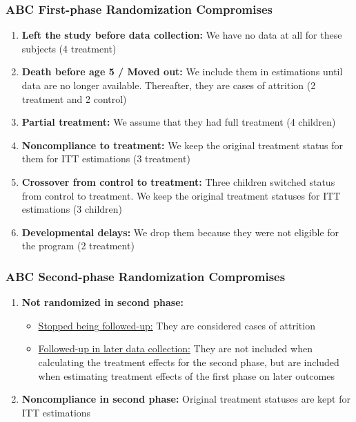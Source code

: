 \documentclass[static]{JJH-Beamer}
\begin{document}
\begin{frame}
 \addtocounter{framenumber}{-1}
\frametitle{ABC First-phase Randomization Compromises}

\begin{enumerate}
\item \textbf{Left the study before data collection:} We have no data at all for these subjects (4 treatment)
\item \textbf{Death before age 5 / Moved out:} We include them in estimations until data are no longer available. Thereafter, they are cases of attrition (2 treatment and 2 control)
\item \textbf{Partial treatment:} We assume that they had full treatment (4 children)
\item \textbf{Noncompliance to treatment:} We keep the original treatment status for them for ITT estimations (3 treatment)
\item \textbf{Crossover from control to treatment:} Three children switched status from control to treatment. We keep the original treatment statuses for ITT estimations (3 children)
\item \textbf{Developmental delays:} We drop them because they were not eligible for the program (2 treatment)
\end{enumerate}

\end{frame}

\begin{frame}
 \addtocounter{framenumber}{-1}
\frametitle{ABC Second-phase Randomization Compromises}

\begin{enumerate}
\item \textbf{Not randomized in second phase:}
	\begin{itemize}
	\item \underline{Stopped being followed-up:} They are considered cases of attrition
    \item \underline{Followed-up in later data collection:} They are not included when calculating the treatment effects for the second phase, but are included when estimating treatment effects of the first phase on later outcomes
	\end{itemize}
\item \textbf{Noncompliance in second phase:} Original treatment statuses are kept for ITT estimations
\end{enumerate}

\end{frame}
\end{document}
